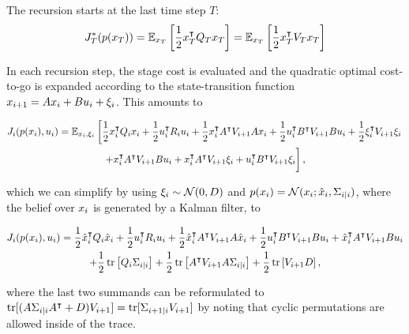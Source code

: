 The recursion starts at the last time step $T$:
\begin{equation}
  J_T^*(p(x_T)) = \mathbb{E}_{x_T} \left[\frac{1}{2} x_T^{\intercal} Q_T x_T \right]
  = \mathbb{E}_{x_T} \left[\frac{1}{2} x_T^{\intercal} V_T x_T \right]
\end{equation}

In each recursion step, the stage cost is evaluated and the quadratic optimal
cost-to-go is expanded according to the state-transition function
$x_{i+1}=Ax_i+Bu_i+\xi_i$. This amounts to
\begin{fullwidth}\vspace{-\baselineskip}
\begin{multline}
  J_\i(p(x_\i), u_\i) = \Exp_{x_\i,\dist_\i} \left[
    \frac{1}{2} x_\i\T \SC_\i x_\i
  + \frac{1}{2} u_\i\T \CC_\i u_\i
  + \frac{1}{2} x_i\T A\T \VM_{\i+1} Ax_\i
  + \frac{1}{2} u_i\T B\T \VM_{\i+1} B u_i
  + \frac{1}{2} \dist_\i\T \VM_{\i+1} \dist_\i \right. \\ \left.
  + x_i\T A\T \VM_{\i+1} B u_\i
  + x_i\T A\T \VM_{\i+1} \dist_\i
  + u_\i\T B\T \VM_{\i+1} \dist_\i
  \vphantom{\frac{1}{2}}\right],
\end{multline}
\end{fullwidth}
which we can simplify by using $\xi_i \sim\mathcal{N}(0,D)$ and $p(x_i) = \mathcal{N}(x_i;
\hat x_i, \Sigma_{i|i})$, where the belief over $x_i$ is generated by a
Kalman filter, to
\begin{fullwidth}\vspace{-\baselineskip}
\begin{multline}
  J_i(p(x_i), u_i) =
    \frac{1}{2} \hat x_i^{\intercal} Q_i \hat x_i
  + \frac{1}{2} u_i^{\intercal} R_i u_i
  + \frac{1}{2} \hat x_i^{\intercal} A^{\intercal} V_{i+1} A\hat x_i
  + \frac{1}{2} u_i^{\intercal} B^{\intercal} V_{i+1} B u_i
  + \hat x_i^{\intercal} A^{\intercal} V_{i+1} B u_i \\
  + \frac{1}{2}\operatorname*{tr}\left[ Q_i \Sigma_{i|i} \right]
  + \frac{1}{2}\operatorname*{tr}\left[ A^{\intercal} V_{i+1} A \Sigma_{i|i} \right]
  + \frac{1}{2}\operatorname*{tr}\left[ V_{i+1} D \right],
\end{multline}
\end{fullwidth}
where the last two summands can be reformulated to $\operatorname*{tr}[(A \Sigma_{i|i}A^{\intercal} +
D) V_{i+1}] = \operatorname*{tr}[\Sigma_{i+1|i} V_{i+1}] $ by noting that
cyclic permutations are allowed inside of the trace.

